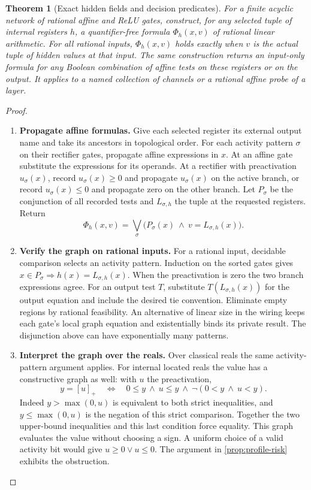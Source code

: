 \documentclass[11pt,a4paper]{article}
\newtheorem{theorem}{Theorem}[section]
\theoremstyle{definition}
\theoremstyle{remark}\newaliascnt{remark}{theorem}
\numberwithin{equation}{section}
\begin{document}
\begin{theorem}[Exact hidden fields and decision predicates]\label{thm:relu-formula}
For a finite acyclic network of rational affine and ReLU gates, construct, for any selected tuple of internal registers $h$, a quantifier-free formula $\Phi_h(x,v)$ of rational linear arithmetic. For all rational inputs, $\Phi_h(x,v)$ holds exactly when $v$ is the actual tuple of hidden values at that input. The same construction returns an input-only formula for any Boolean combination of affine tests on these registers or on the output. It applies to a named collection of channels or a rational affine probe of a layer.
\end{theorem}
\begin{proof}\leavevmode
\begin{enumerate}[titledsteps]
    \item \textbf{Propagate affine formulas.} Give each selected register its external output name and take its ancestors in topological order. For each activity pattern $\sigma$ on their rectifier gates, propagate affine expressions in $x$. At an affine gate substitute the expressions for its operands. At a rectifier with preactivation $u_\sigma(x)$, record $u_\sigma(x)\ge0$ and propagate $u_\sigma(x)$ on the active branch, or record $u_\sigma(x)\le0$ and propagate zero on the other branch. Let $P_\sigma$ be the conjunction of all recorded tests and $L_{\sigma,h}$ the tuple at the requested registers. Return
\[
 \Phi_h(x,v)=\bigvee_\sigma\big(P_\sigma(x)\ \wedge\ v=L_{\sigma,h}(x)\big).
\]

    \item \textbf{Verify the graph on rational inputs.} For a rational input, decidable comparison selects an activity pattern. Induction on the sorted gates gives \(x\in P_\sigma\Rightarrow h(x)=L_{\sigma,h}(x)\). When the preactivation is zero the two branch expressions agree. For an output test \(T\), substitute \(T(L_{\sigma,h}(x))\) for the output equation and include the desired tie convention. Eliminate empty regions by rational feasibility. An alternative of linear size in the wiring keeps each gate's local graph equation and existentially binds its private result. The disjunction above can have exponentially many patterns.


    \item \textbf{Interpret the graph over the reals.} Over classical reals the same activity-pattern argument applies. For internal located reals the value has a constructive graph as well: with \(u\) the preactivation,
\[
 y=[u]_+\quad\Longleftrightarrow\quad
 0\le y\ \wedge\ u\le y\ \wedge\ \neg(0<y\ \wedge\ u<y).
\]
Indeed \(y>\max(0,u)\) is equivalent to both strict inequalities, and \(y\le\max(0,u)\) is the negation of this strict comparison. Together the two upper-bound inequalities and this last condition force equality. This graph evaluates the value without choosing a sign. A uniform choice of a valid activity bit would give \(u\ge0\lor u\le0\). The argument in \cref{prop:profile-risk} exhibits the obstruction.\qedhere
\end{enumerate}
\end{proof}
\end{document}
